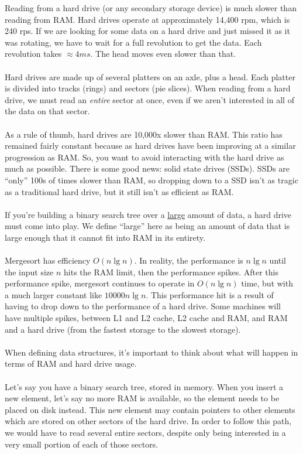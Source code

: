 \documentclass[]{article}
\theoremstyle{definition}
\begin{document}
			Reading from a hard drive (or any secondary storage device) is much slower than reading from RAM. Hard drives operate at approximately 14,400 rpm, which is 240 rps. If we are looking for some data on a hard drive and just missed it as it was rotating, we have to wait for a full revolution to get the data. Each revolution takes $\approx 4 ms$. The head moves even slower than that.
			\\ \\
			Hard drives are made up of several platters on an axle, plus a head. Each platter is divided into tracks (rings) and sectors (pie slices). When reading from a hard drive, we must read an \emph{entire} sector at once, even if we aren't interested in all of the data on that sector.
			\\ \\
			As a rule of thumb, hard drives are 10,000x slower than RAM. This ratio has remained fairly constant because as hard drives have been improving at a similar progression as RAM. So, you want to avoid interacting with the hard drive as much as possible. There is some good news: solid state drives (SSDs). SSDs are ``only'' 100s of times slower than RAM, so dropping down to a SSD isn't as tragic as a traditional hard drive, but it still isn't as efficient as RAM.
			\\ \\
			If you're building a binary search tree over a \underline{large} amount of data, a hard drive must come into play. We define ``large'' here as being an amount of data that is large enough that it cannot fit into RAM in its entirety.
			\\ \\
			Mergesort has efficiency $O(n \lg n)$. In reality, the performance is $n \lg n$ until the input size $n$ hits the RAM limit, then the performance spikes. After this performance spike, mergesort continues to operate in $O(n \lg n)$ time, but with a much larger constant like $10000n \lg n$. This performance hit is a result of having to drop down to the performance of a hard drive. Some machines will have multiple spikes, between L1 and L2 cache, L2 cache and RAM, and RAM and a hard drive (from the fastest storage to the slowest storage).
			\\ \\
			When defining data structures, it's important to think about what will happen in terms of RAM and hard drive usage.
			\\ \\
			Let's say you have a binary search tree, stored in memory. When you insert a new element, let's say no more RAM is available, so the element needs to be placed on disk instead. This new element may contain pointers to other elements which are stored on other sectors of the hard drive. In order to follow this path, we would have to read several entire sectors, despite only being interested in a very small portion of each of those sectors.
\end{document}
